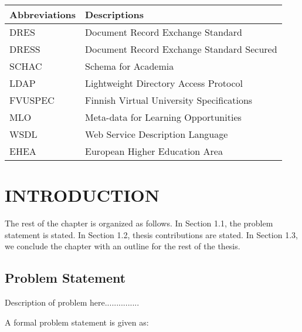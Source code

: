 \documentclass[12pt,a4paper,oneside]{book} %
\begin{document}
\begin{table}[h]
    \renewcommand{\arraystretch}{1.3}
    \label{table:table1}
     \begin{tabular}{ll}
        \hline\hline
            {\bfseries Abbreviations} & {\bfseries Descriptions} \\
            \hline                                      %
            DRES & Document Record Exchange Standard  \\
            DRESS & Document Record Exchange Standard Secured  \\
            SCHAC & Schema for Academia  \\
            LDAP & Lightweight Directory Access Protocol \\
            FVUSPEC & Finnish Virtual University Specifications  \\
            MLO & Meta-data for Learning Opportunities  \\
            WSDL & Web Service Description Language  \\
            EHEA & European Higher Education Area  \\
            \hline                          %
    \end{tabular}
\end{table}

\listoffigures
\listoftables

%
\resetpagenumbering

\chapter{INTRODUCTION}\label{c-intro}

The rest of the chapter is organized as follows. In Section 1.1, the problem statement is stated. In Section 1.2, thesis contributions are stated. In Section 1.3, we conclude the chapter with an outline for the rest of the thesis.

\section{Problem Statement}

Description of problem here...............

A formal problem statement is given as:
\end{document}
